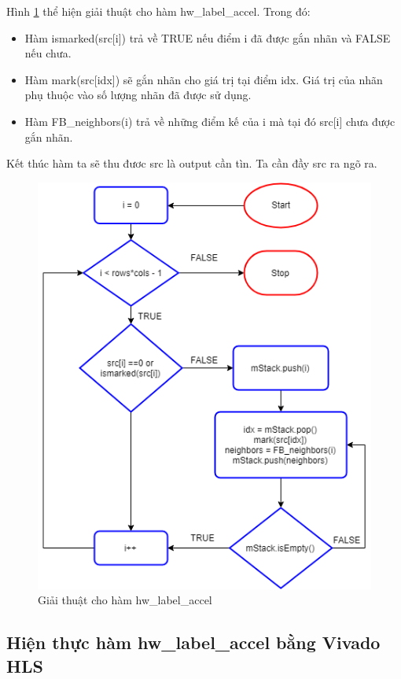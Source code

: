     Hình \ref{fig:overlayalgorithmflow} thể hiện giải thuật cho hàm hw\_label\_accel. Trong đó:
    \begin{itemize}
        \item Hàm ismarked(src[i]) trả về TRUE nếu điểm i đã được gắn nhãn và FALSE nếu chưa.
        \item Hàm mark(src[idx]) sẽ gắn nhãn cho giá trị tại điểm idx. Giá trị của nhãn phụ thuộc vào số lượng nhãn đã được sử dụng.
        \item Hàm FB\_neighbors(i) trả về những điểm kế của i mà tại đó src[i] chưa được gắn nhãn.
    \end{itemize}
    Kết thúc hàm ta sẽ thu đươc src là output cần tìn. Ta cần đầy src ra ngõ ra.
    \begin{figure}[htp]
    	\centering
     	\includegraphics[scale=.8]{images/overlay_algo_flow.png}
    	\caption{Giải thuật cho hàm hw\_label\_accel}
    	\label{fig:overlayalgorithmflow}
    \end{figure}
    
    \subsection{Hiện thực hàm hw\_label\_accel bằng Vivado HLS}
    